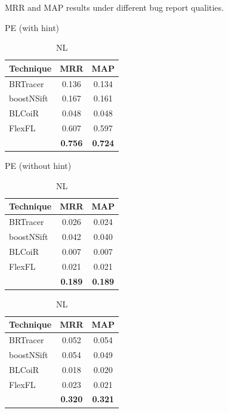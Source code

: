 
\begin{table}[h]
\centering \footnotesize
\caption{MRR and MAP results under different bug report qualities.}\label{tab:db}
\vspace{-8pt}
\begin{subtable}{0.32\textwidth}
\centering
\caption{PE (with hint)}
\begin{tabular}{lcc}
\toprule
Technique & MRR & MAP \\
\midrule
BRTracer & 0.136 & 0.134 \\
boostNSift & 0.167 & 0.161 \\
BLCoiR & 0.048 & 0.048 \\
FlexFL & 0.607 & 0.597 \\
\Name{} & \textbf{0.756} & \textbf{0.724} \\
\bottomrule
\end{tabular}
\end{subtable}
\hfill
\begin{subtable}{0.32\textwidth}
\centering
\caption{PE (without hint)}
\begin{tabular}{lcc}
\toprule
Technique & MRR & MAP \\
\midrule
BRTracer & 0.026 & 0.024 \\
boostNSift & 0.042 & 0.040 \\
BLCoiR & 0.007 & 0.007 \\
FlexFL & 0.021 & 0.021 \\
\Name{} & \textbf{0.189} & \textbf{0.189} \\
\bottomrule
\end{tabular}
\end{subtable}
\hfill
\begin{subtable}{0.32\textwidth}
\centering
\caption{NL}
\begin{tabular}{lcc}
\toprule
Technique & MRR & MAP \\
\midrule
BRTracer & 0.052 & 0.054 \\
boostNSift & 0.054 & 0.049 \\
BLCoiR & 0.018 & 0.020 \\
FlexFL & 0.023 & 0.021 \\
\Name{} & \textbf{0.320} & \textbf{0.321} \\
\bottomrule
\end{tabular}
\end{subtable}
\end{table}

